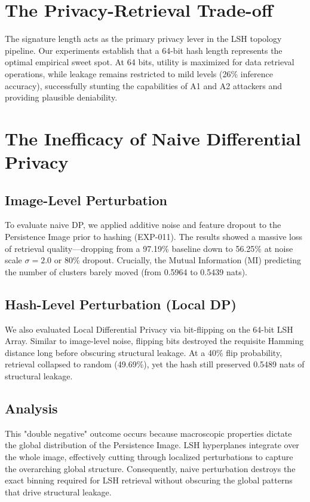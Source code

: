 \documentclass[10pt, conference]{IEEEtran}
\begin{document}
\section{The Privacy-Retrieval Trade-off}
The signature length acts as the primary privacy lever in the LSH topology pipeline. Our experiments establish that a 64-bit hash length represents the optimal empirical sweet spot. At 64 bits, utility is maximized for data retrieval operations, while leakage remains restricted to mild levels (26\% inference accuracy), successfully stunting the capabilities of A1 and A2 attackers and providing plausible deniability. 

\section{The Inefficacy of Naive Differential Privacy}
\subsection{Image-Level Perturbation}
To evaluate naive DP, we applied additive noise and feature dropout to the Persistence Image prior to hashing (EXP-011). The results showed a massive loss of retrieval quality—dropping from a 97.19\% baseline down to 56.25\% at noise scale $\sigma=2.0$ or 80\% dropout. Crucially, the Mutual Information (MI) predicting the number of clusters barely moved (from 0.5964 to 0.5439 nats). 
\subsection{Hash-Level Perturbation (Local DP)}
We also evaluated Local Differential Privacy via bit-flipping on the 64-bit LSH Array. Similar to image-level noise, flipping bits destroyed the requisite Hamming distance long before obscuring structural leakage. At a 40\% flip probability, retrieval collapsed to random (49.69\%), yet the hash still preserved 0.5489 nats of structural leakage.
\subsection{Analysis}
This "double negative" outcome occurs because macroscopic properties dictate the global distribution of the Persistence Image. LSH hyperplanes integrate over the whole image, effectively cutting through localized perturbations to capture the overarching global structure. Consequently, naive perturbation destroys the exact binning required for LSH retrieval without obscuring the global patterns that drive structural leakage.
\end{document}
